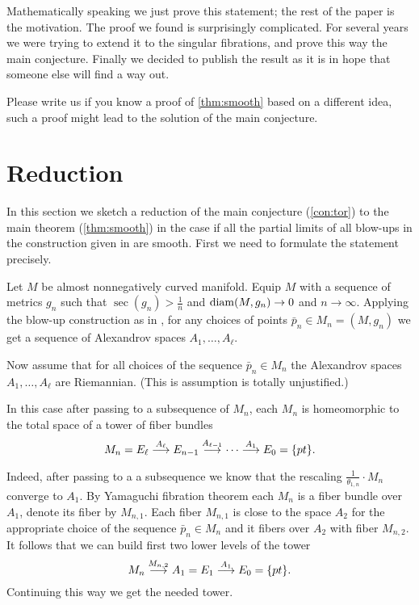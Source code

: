 \documentclass{amsart}
\begin{document}
Mathematically speaking we just prove this statement;
the rest of the paper is the motivation.
The proof we found is surprisingly complicated.
For several years we were trying to extend it to the singular fibrations, and prove this way the main conjecture.
Finally we decided to publish the result as it is in hope that someone else will find a way out.

Please write us if you know a proof of \ref{thm:smooth} based on a different idea,
such a proof might lead to the solution of the main conjecture.

\section{Reduction}\label{sec:reduction}

In this section we sketch a reduction of the main conjecture (\ref{con:tor}) to the main theorem (\ref{thm:smooth}) in the case if all the partial limits of all blow-ups in the construction given in \cite[Subsection 4.3]{KPT} are smooth. 
First we need to formulate the statement precisely. 

Let $M$ be almost nonnegatively curved manifold.
Equip $M$ with a sequence of metrics $g_n$ such that $\sec(g_n)>\tfrac1n$ and $\operatorname{\rm diam} (M,g_n)\to 0$ and $n\to\infty$.
Applying the blow-up construction as in \cite[Subsection 4.3]{KPT},
for any choices of points $\bar p_n\in M_n=(M,g_n)$
we get a sequence of Alexandrov spaces $ A_1,\dots, A_\ell$.

Now assume that for all choices of the sequence $\bar p_n\in M_n$
the Alexandrov spaces $A_1,\dots, A_\ell$ are Riemannian.
(This is assumption is totally unjustified.)

In this case after passing to a subsequence of $M_n$,
each $M_n$ is homeomorphic to the total space of a tower of fiber bundles
$$M_n=E_\ell\buildrel {A_\ell}\over \longrightarrow E_{n-1}\buildrel {A_{\ell-1}}\over\longrightarrow\dots\buildrel {A_1}\over\longrightarrow E_0=\{pt\}.$$

Indeed, after passing to a a subsequence we know that the rescaling $\tfrac1{\theta_{1,n}}\cdot M_n$ converge to $A_1$.
By Yamaguchi fibration theorem each $M_n$ is a fiber bundle over $A_1$, denote its fiber by $M_{n,1}$.
Each fiber $M_{n,1}$ is close to the space $A_2$ for the appropriate choice of the sequence $\bar p_n\in M_n$
and it fibers over $A_2$ with fiber $M_{n,2}$.
It follows that we can build first two lower levels of the tower
$$M_n\buildrel {M_{n,2}}\over \longrightarrow A_1=E_1\buildrel {A_1}\over\longrightarrow E_0=\{pt\}.$$
Continuing this way we get the needed tower.
\end{document}
